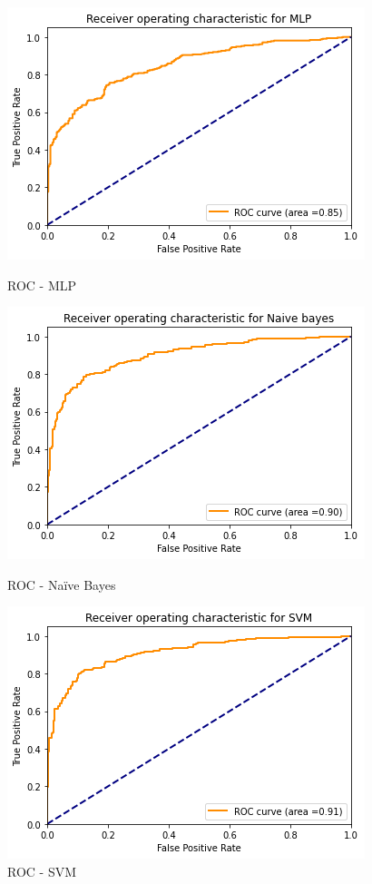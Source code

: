 \begin{figure}[!h]
\centering
{}
  \includegraphics[width=\linewidth]{Images/mlp_roc.png}
  \caption{ROC - MLP}\label{fig:awesome_image1}
\endminipage\hfill
{}
  \includegraphics[width=\linewidth]{Images/nb_roc.png}
  \caption{ROC - Naïve Bayes}\label{fig:awesome_image2}
\endminipage\hfill
{}%
  \includegraphics[width=\linewidth]{Images/svm_roc.png}
  \caption{ROC - SVM}\label{fig:awesome_image3}
\endminipage
\end{figure}